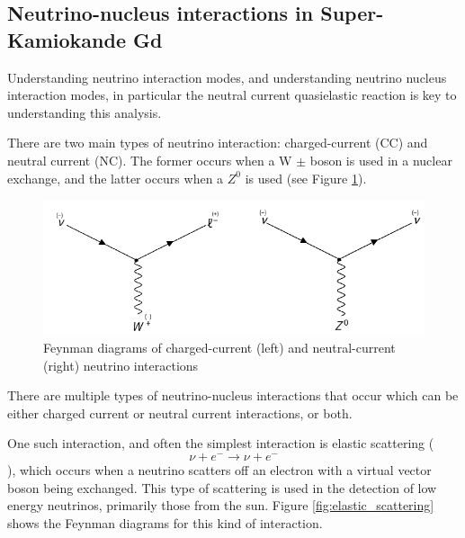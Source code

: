 \subsection{Neutrino-nucleus interactions in Super-Kamiokande Gd}
Understanding neutrino interaction modes, and understanding neutrino nucleus interaction modes, in particular the neutral current quasielastic reaction is key to understanding this analysis. 

There are two main types of neutrino interaction: charged-current (CC) and neutral current (NC). The former occurs when a W $\pm$ boson is used in a nuclear exchange, and the latter occurs when a $Z^{0}$ is used (see Figure \ref{fig:CC_NC}).

\begin{figure}
    \includegraphics[width=\textwidth]{Figures/CC_NC.png}
    \caption{Feynman diagrams of charged-current (left) and neutral-current (right) neutrino interactions}
    \label{fig:CC_NC}
\end{figure}

There are multiple types of neutrino-nucleus interactions that occur which can be either charged current or neutral current interactions, or both. 

One such interaction, and often the simplest interaction is elastic scattering ($$
\nu+e^{-} \rightarrow \nu+e^{-}
$$), which occurs when a neutrino scatters off an electron with a virtual vector boson being exchanged. This type of scattering is used in the detection of low energy neutrinos, primarily those from the sun. Figure \ref{fig:elastic_scattering} shows the Feynman diagrams for this kind of interaction.

